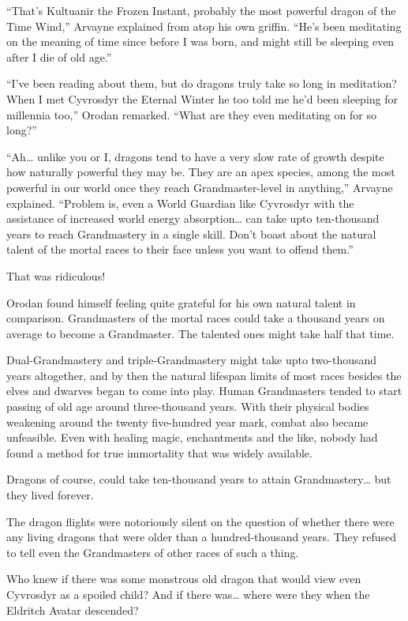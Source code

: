 \documentclass[a4paper,10pt]{book}
\begin{document}
“That’s Kultuanir the Frozen Instant, probably the most powerful dragon of the Time Wind,” Arvayne explained from atop his own griffin. “He’s been meditating on the meaning of time since before I was born, and might still be sleeping even after I die of old age.”\par
“I’ve been reading about them, but do dragons truly take so long in meditation? When I met Cyvrosdyr the Eternal Winter he too told me he’d been sleeping for millennia too,” Orodan remarked. “What are they even meditating on for so long?”\par
“Ah… unlike you or I, dragons tend to have a very slow rate of growth despite how naturally powerful they may be. They are an apex species, among the most powerful in our world once they reach Grandmaster-level in anything,” Arvayne explained. “Problem is, even a World Guardian like Cyvrosdyr with the assistance of increased world energy absorption… can take upto ten-thousand years to reach Grandmastery in a single skill. Don’t boast about the natural talent of the mortal races to their face unless you want to offend them.”\par
That was ridiculous!\par
Orodan found himself feeling quite grateful for his own natural talent in comparison. Grandmasters of the mortal races could take a thousand years on average to become a Grandmaster. The talented ones might take half that time.\par
Dual-Grandmastery and triple-Grandmastery might take upto two-thousand years altogether, and by then the natural lifespan limits of most races besides the elves and dwarves began to come into play. Human Grandmasters tended to start passing of old age around three-thousand years. With their physical bodies weakening around the twenty five-hundred year mark, combat also became unfeasible. Even with healing magic, enchantments and the like, nobody had found a method for true immortality that was widely available.\par
Dragons of course, could take ten-thousand years to attain Grandmastery… but they lived forever.\par
The dragon flights were notoriously silent on the question of whether there were any living dragons that were older than a hundred-thousand years. They refused to tell even the Grandmasters of other races of such a thing.\par
Who knew if there was some monstrous old dragon that would view even Cyvrosdyr as a spoiled child? And if there was… where were they when the Eldritch Avatar descended?\par
\end{document}
